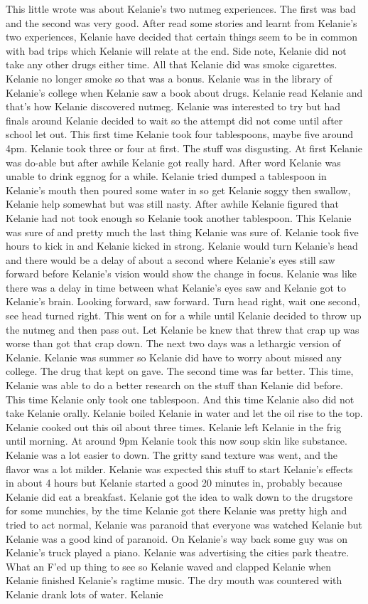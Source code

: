 \documentclass[12pt]{book}
\begin{document}
This little wrote was about Kelanie's two nutmeg experiences. The first was bad and the second was very good. After read some stories and learnt from Kelanie's two experiences, Kelanie have decided that certain things seem to be in common with bad trips which Kelanie will relate at the end. Side note, Kelanie did not take any other drugs either time. All that Kelanie did was smoke cigarettes. Kelanie no longer smoke so that was a bonus. Kelanie was in the library of Kelanie's college when Kelanie saw a book about drugs. Kelanie read Kelanie and that's how Kelanie discovered nutmeg. Kelanie was interested to try but had finals around Kelanie decided to wait so the attempt did not come until after school let out. This first time Kelanie took four tablespoons, maybe five around 4pm. Kelanie took three or four at first. The stuff was disgusting. At first Kelanie was do-able but after awhile Kelanie got really hard. After word Kelanie was unable to drink eggnog for a while. Kelanie tried dumped a tablespoon in Kelanie's mouth then poured some water in so get Kelanie soggy then swallow, Kelanie help somewhat but was still nasty. After awhile Kelanie figured that Kelanie had not took enough so Kelanie took another tablespoon. This Kelanie was sure of and pretty much the last thing Kelanie was sure of. Kelanie took five hours to kick in and Kelanie kicked in strong. Kelanie would turn Kelanie's head and there would be a delay of about a second where Kelanie's eyes still saw forward before Kelanie's vision would show the change in focus. Kelanie was like there was a delay in time between what Kelanie's eyes saw and Kelanie got to Kelanie's brain. Looking forward, saw forward. Turn head right, wait one second, see head turned right. This went on for a while until Kelanie decided to throw up the nutmeg and then pass out. Let Kelanie be knew that threw that crap up was worse than got that crap down. The next two days was a lethargic version of Kelanie. Kelanie was summer so Kelanie did have to worry about missed any college. The drug that kept on gave. The second time was far better. This time, Kelanie was able to do a better research on the stuff than Kelanie did before. This time Kelanie only took one tablespoon. And this time Kelanie also did not take Kelanie orally. Kelanie boiled Kelanie in water and let the oil rise to the top. Kelanie cooked out this oil about three times. Kelanie left Kelanie in the frig until morning. At around 9pm Kelanie took this now soup skin like substance. Kelanie was a lot easier to down. The gritty sand texture was went, and the flavor was a lot milder. Kelanie was expected this stuff to start Kelanie's effects in about 4 hours but Kelanie started a good 20 minutes in, probably because Kelanie did eat a breakfast. Kelanie got the idea to walk down to the drugstore for some munchies, by the time Kelanie got there Kelanie was pretty high and tried to act normal, Kelanie was paranoid that everyone was watched Kelanie but Kelanie was a good kind of paranoid. On Kelanie's way back some guy was on Kelanie's truck played a piano. Kelanie was advertising the cities park theatre. What an F'ed up thing to see so Kelanie waved and clapped Kelanie when Kelanie finished Kelanie's ragtime music. The dry mouth was countered with Kelanie drank lots of water. Kelanie 
\end{document}
